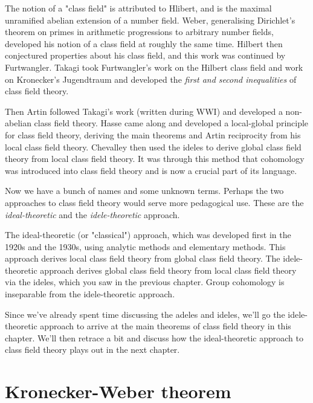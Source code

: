 \documentclass[a4paper, 12pt,oneside,openany]{book}
\begin{document}
The notion of a "class field" is attributed to Hlibert, and is the maximal unramified abelian extension of a number field. Weber, generalising Dirichlet's theorem on primes in arithmetic progressions to arbitrary number fields, developed his notion of a class field at roughly the same time. Hilbert then conjectured properties about his class field, and this work was continued by Furtwangler. Takagi took Furtwangler's work on the Hilbert class field and work on Kronecker's Jugendtraum and developed the \emph{first and second inequalities} of class field theory. 

Then Artin followed Takagi's work (written during WWI) and developed a non-abelian class field theory. Hasse came along and developed a local-global principle for class field theory, deriving the main theorems and Artin reciprocity from his local class field theory. Chevalley then used the ideles to derive global class field theory from local class field theory. It was through this method that cohomology was introduced into class field theory and is now a crucial part of its language.

Now we have a bunch of names and some unknown terms. Perhaps the two approaches to class field theory would serve more pedagogical use. These are the \emph{ideal-theoretic} and the \emph{idele-theoretic} approach. 

The ideal-theoretic (or "classical") approach, which was developed first in the 1920s and the 1930s, using analytic methods and elementary methods. This approach derives local class field theory from global class field theory. The idele-theoretic approach derives global class field theory from local class field theory via the ideles, which you saw in the previous chapter. Group cohomology is inseparable from the idele-theoretic approach. 

Since we've already spent time discussing the adeles and ideles, we'll go the idele-theoretic approach to arrive at the main theorems of class field theory in this chapter. We'll then retrace a bit and discuss how the ideal-theoretic approach to class field theory plays out in the next chapter.

\section{Kronecker-Weber theorem}

\end{document}
